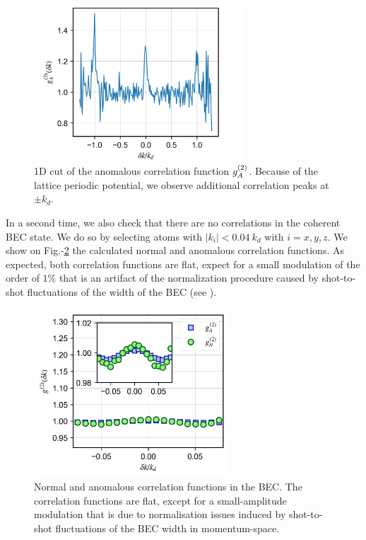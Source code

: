 \begin{figure}[ht!]
    \centering
    \includegraphics[width=0.7\textwidth]{Fig/Chapter4/periodicity.png}
    \caption{1D cut of the anomalous correlation function $g^{(2)}_A$. Because of the lattice periodic potential, we observe additional correlation peaks at $\pm k_d$.}
    \label{fig:periodicity}
\end{figure}

In a second time, we also check that there are no correlations in the coherent BEC state. We do so by selecting atoms with $|k_i|<0.04 \ k_d$ with $i=x,y,z$. We show on Fig.-\ref{fig:BEC_correlations} the calculated normal and anomalous correlation functions. As expected, both correlation functions are flat, expect for a small modulation of the order of $1 \%$ that is an artifact of the normalization procedure caused by shot-to-shot fluctuations of the width of the BEC (see \cite{cayla_these}).

\begin{figure}[ht!]
    \centering
    \includegraphics[width=0.65\textwidth]{Fig/Chapter4/correlations_BEC.png}
    \caption{Normal and anomalous correlation functions in the BEC. The correlation functions are flat, except for a small-amplitude modulation that is due to normalisation issues induced by shot-to-shot fluctuations of the BEC width in momentum-space.}
    \label{fig:BEC_correlations}
\end{figure}

